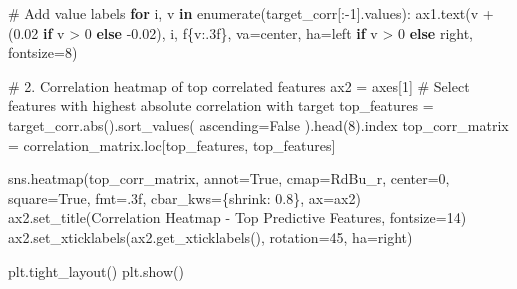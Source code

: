 \documentclass[
  letterpaper,
  DIV=11,
  numbers=noendperiod]{scrartcl}
\newenvironment{Shaded}{\begin{snugshade}}{\end{snugshade}}
\newcommand{\BuiltInTok}[1]{\textcolor[rgb]{0.00,0.23,0.31}{#1}}
\newcommand{\CommentTok}[1]{\textcolor[rgb]{0.37,0.37,0.37}{#1}}
\newcommand{\ControlFlowTok}[1]{\textcolor[rgb]{0.00,0.23,0.31}{\textbf{#1}}}
\newcommand{\DecValTok}[1]{\textcolor[rgb]{0.68,0.00,0.00}{#1}}
\newcommand{\FloatTok}[1]{\textcolor[rgb]{0.68,0.00,0.00}{#1}}
\newcommand{\KeywordTok}[1]{\textcolor[rgb]{0.00,0.23,0.31}{\textbf{#1}}}
\newcommand{\NormalTok}[1]{\textcolor[rgb]{0.00,0.23,0.31}{#1}}
\newcommand{\OperatorTok}[1]{\textcolor[rgb]{0.37,0.37,0.37}{#1}}
\newcommand{\SpecialCharTok}[1]{\textcolor[rgb]{0.37,0.37,0.37}{#1}}
\newcommand{\SpecialStringTok}[1]{\textcolor[rgb]{0.13,0.47,0.30}{#1}}
\newcommand{\StringTok}[1]{\textcolor[rgb]{0.13,0.47,0.30}{#1}}
\newcommand{\VariableTok}[1]{\textcolor[rgb]{0.07,0.07,0.07}{#1}}
\renewenvironment{Shaded}{%
  \begin{tcolorbox}[%
    enhanced,%
    colback=codebg,%
    colframe=codebg,%
    borderline west={3pt}{0pt}{sectionblue},%
    fontupper=\small\ttfamily,%
    boxrule=0pt,%
    arc=0pt,%
    boxsep=5pt,%
    left=2mm,%
    right=2mm,%
    top=2mm,%
    bottom=2mm%
  ]%
}{%
  \end{tcolorbox}%
}
\begin{document}
\begin{Shaded}
\begin{Highlighting}[]
\CommentTok{\# Add value labels}
\ControlFlowTok{for}\NormalTok{ i, v }\KeywordTok{in} \BuiltInTok{enumerate}\NormalTok{(target\_corr[:}\OperatorTok{{-}}\DecValTok{1}\NormalTok{].values):}
\NormalTok{    ax1.text(v }\OperatorTok{+}\NormalTok{ (}\FloatTok{0.02} \ControlFlowTok{if}\NormalTok{ v }\OperatorTok{\textgreater{}} \DecValTok{0} \ControlFlowTok{else} \OperatorTok{{-}}\FloatTok{0.02}\NormalTok{), i, }\SpecialStringTok{f\textquotesingle{}}\SpecialCharTok{\{}\NormalTok{v}\SpecialCharTok{:.3f\}}\SpecialStringTok{\textquotesingle{}}\NormalTok{, }
\NormalTok{             va}\OperatorTok{=}\StringTok{\textquotesingle{}center\textquotesingle{}}\NormalTok{, ha}\OperatorTok{=}\StringTok{\textquotesingle{}left\textquotesingle{}} \ControlFlowTok{if}\NormalTok{ v }\OperatorTok{\textgreater{}} \DecValTok{0} \ControlFlowTok{else} \StringTok{\textquotesingle{}right\textquotesingle{}}\NormalTok{, fontsize}\OperatorTok{=}\DecValTok{8}\NormalTok{)}

\CommentTok{\# 2. Correlation heatmap of top correlated features}
\NormalTok{ax2 }\OperatorTok{=}\NormalTok{ axes[}\DecValTok{1}\NormalTok{]}
\CommentTok{\# Select features with highest absolute correlation with target}
\NormalTok{top\_features }\OperatorTok{=}\NormalTok{ target\_corr.}\BuiltInTok{abs}\NormalTok{().sort\_values(}
\NormalTok{    ascending}\OperatorTok{=}\VariableTok{False}
\NormalTok{).head(}\DecValTok{8}\NormalTok{).index}
\NormalTok{top\_corr\_matrix }\OperatorTok{=}\NormalTok{ correlation\_matrix.loc[top\_features, top\_features]}

\NormalTok{sns.heatmap(top\_corr\_matrix, annot}\OperatorTok{=}\VariableTok{True}\NormalTok{, cmap}\OperatorTok{=}\StringTok{\textquotesingle{}RdBu\_r\textquotesingle{}}\NormalTok{, center}\OperatorTok{=}\DecValTok{0}\NormalTok{,}
\NormalTok{            square}\OperatorTok{=}\VariableTok{True}\NormalTok{, fmt}\OperatorTok{=}\StringTok{\textquotesingle{}.3f\textquotesingle{}}\NormalTok{, cbar\_kws}\OperatorTok{=}\NormalTok{\{}\StringTok{\textquotesingle{}shrink\textquotesingle{}}\NormalTok{: }\FloatTok{0.8}\NormalTok{\}, ax}\OperatorTok{=}\NormalTok{ax2)}
\NormalTok{ax2.set\_title(}\StringTok{\textquotesingle{}Correlation Heatmap {-} Top Predictive Features\textquotesingle{}}\NormalTok{, fontsize}\OperatorTok{=}\DecValTok{14}\NormalTok{)}
\NormalTok{ax2.set\_xticklabels(ax2.get\_xticklabels(), rotation}\OperatorTok{=}\DecValTok{45}\NormalTok{, ha}\OperatorTok{=}\StringTok{\textquotesingle{}right\textquotesingle{}}\NormalTok{)}

\NormalTok{plt.tight\_layout()}
\NormalTok{plt.show()}
\end{Highlighting}
\end{Shaded}
\end{document}
